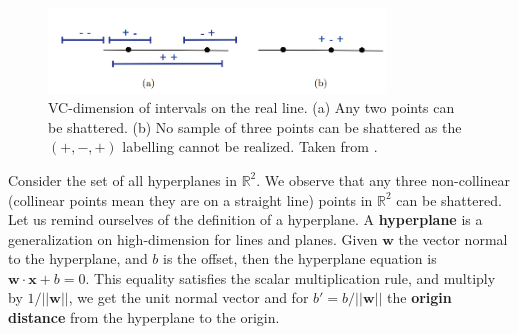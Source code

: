 \begin{figure}[h!]
    \centering
    \includegraphics[width=0.8\textwidth]{img/vc_dim_ex1.png}
    \caption{VC-dimension of intervals on the real line. (a) Any two points can be shattered. (b) No sample of three points can be shattered as the $(+,-,+)$ labelling cannot be realized. Taken from \cite{10.5555/2371238}.}
\end{figure}
\begin{example}[Hyperplane]
    Consider the set of all hyperplanes in $\mathbb{R}^{2}$. We observe that any three non-collinear (collinear points mean they are on a straight line) points in $\mathbb{R}^{2}$ can be shattered. Let us remind ourselves of the definition of a hyperplane. A \textbf{hyperplane} is a generalization on high-dimension for lines and planes. Given $\mathbf{w}$ the vector normal to the hyperplane, and $b$ is the offset, then the hyperplane equation is $\mathbf{w}\cdot \mathbf{x}+b=0$. This equality satisfies the scalar multiplication rule, and multiply by $1/\lvert \lvert \mathbf{w}\rvert\rvert$, we get the unit normal vector and for $b'=b/\lvert \lvert \mathbf{w}\rvert\rvert$ the \textbf{origin distance} from the hyperplane to the origin. 


\end{example}

